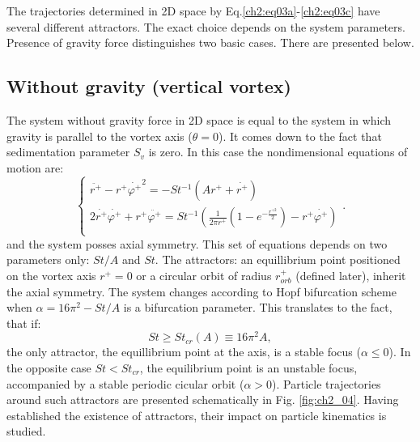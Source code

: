 \documentclass[../main.tex]{subfiles}
\begin{document}
The trajectories determined in 2D space by Eq.\ref{ch2:eq03a}-\ref{ch2:eq03c} have several different attractors. The exact choice depends on the system parameters. Presence of gravity force distinguishes two basic cases. There are presented below.

\subsection{Without gravity (vertical vortex)}
The system without gravity force in 2D space is equal to the system in which gravity is parallel to the vortex axis ($\theta=0$). It comes down to the fact that sedimentation parameter $S_v$ is zero. In this case the nondimensional equations of motion are:
\begin{equation}
\left\{\begin{array}{l}
\ddot{r^+}-r^+\dot{\varphi^+}^2=-St^{-1}\left(A r^++\dot{r^+}\right) \\
2\dot{r^+}\dot{\varphi^+}+r^+\ddot{\varphi^+}=St^{-1}\left(\frac{1}{2 \pi r^+}(1-e^{-\frac{r^{+ 2}}{2}})-r^+\dot{\varphi^+}\right)\\
\end{array}.\right.
\label{ch3:eq16}
\end{equation}
and the system posses axial symmetry. This set of equations depends on two parameters only: $St/A$ and $St$. The attractors: an equillibrium point positioned on the vortex axis $r^+=0$ or a circular orbit of radius $r^+_{orb}$ (defined later), inherit the axial symmetry. The system changes according to Hopf bifurcation scheme when $\alpha=16 \pi^2-St/A$ is a bifurcation parameter. This translates to the fact, that if:
\begin{equation}
St \geq St_{cr}(A) \equiv 16 \pi^2 A,
\label{ch3:eq17}
\end{equation}
the only attractor, the equillibrium point at the axis, is a stable focus ($\alpha \leq 0$). In the opposite case $St < St_{cr}$, the equilibrium point is an unstable focus, accompanied by a stable periodic cicular orbit ($\alpha>0$). Particle trajectories around such attractors are presented schematically in Fig. \ref{fig:ch2_04}. Having established the existence of attractors, their impact on particle kinematics is studied.\\
\end{document}
